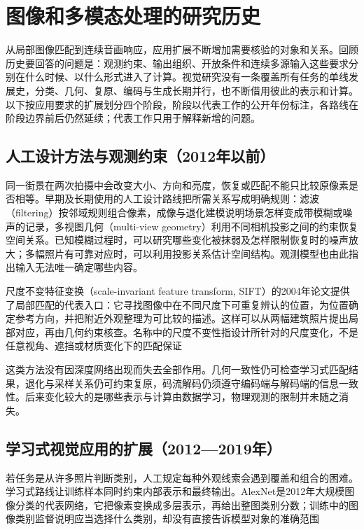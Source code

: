 \section{图像和多模态处理的研究历史}
\label{sec:vision-overview-history}

从局部图像匹配到连续音画响应，应用扩展不断增加需要核验的对象和关系。回顾历史要回答的问题是：观测约束、输出组织、开放条件和连续多源输入这些要求分别在什么时候、以什么形式进入了计算。视觉研究没有一条覆盖所有任务的单线发展史，分类、几何、复原、编码与生成长期并行，也不断借用彼此的表示和计算。以下按应用要求的扩展划分四个阶段，阶段以代表工作的公开年份标注，各路线在阶段边界前后仍然延续；代表工作只用于解释新增的问题。

\subsection{人工设计方法与观测约束（2012年以前）}
\label{sec:vision-overview-classical-history}

同一街景在两次拍摄中会改变大小、方向和亮度，恢复或匹配不能只比较原像素是否相等。早期及长期使用的人工设计路线把所需关系写成明确规则：滤波（filtering）按邻域规则组合像素，成像与退化建模说明场景怎样变成带模糊或噪声的记录，多视图几何（multi-view geometry）利用不同相机投影之间的约束恢复空间关系。已知模糊过程时，可以研究哪些变化被抹弱及怎样限制恢复时的噪声放大；多幅照片有可靠对应时，可以利用投影关系估计空间结构。观测模型也由此指出输入无法唯一确定哪些内容。

尺度不变特征变换（scale-invariant feature transform, SIFT）的2004年论文提供了局部匹配的代表入口：它寻找图像中在不同尺度下可重复辨认的位置，为位置确定参考方向，并把附近外观整理为可比较的描述。这样可以从两幅建筑照片提出局部对应，再由几何约束核查。名称中的尺度不变性指设计所针对的尺度变化，不是任意视角、遮挡或材质变化下的匹配保证

这类方法没有因深度网络出现而失去全部作用。几何一致性仍可检查学习式匹配结果，退化与采样关系仍可约束复原，码流解码仍须遵守编码端与解码端的信息一致性。后来变化较大的是哪些表示与计算由数据学习，物理观测的限制并未随之消失。

\subsection{学习式视觉应用的扩展（2012—2019年）}
\label{sec:vision-overview-learned-history}

若任务是从许多照片判断类别，人工规定每种外观线索会遇到覆盖和组合的困难。学习式路线让训练样本同时约束内部表示和最终输出。AlexNet是2012年大规模图像分类的代表网络，它把像素变换成多层表示，再给出整图类别分数；训练中的图像类别监督说明应当选择什么类别，却没有直接告诉模型对象的准确范围

